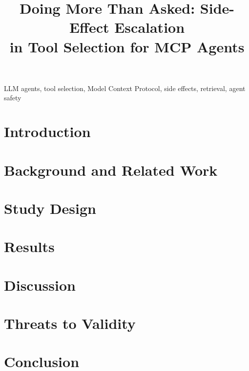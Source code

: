 \documentclass[conference]{IEEEtran}
\begin{document}
\title{Doing More Than Asked: Side-Effect Escalation\\in Tool Selection for MCP Agents}

\author{
\and
{}
}

\maketitle

\begin{abstract}

\end{abstract}

\begin{IEEEkeywords}
LLM agents, tool selection, Model Context Protocol, side effects, retrieval, agent safety
\end{IEEEkeywords}

\section{Introduction}


\section{Background and Related Work}


\section{Study Design}


\section{Results}


\section{Discussion}


\section{Threats to Validity}\label{sec:threats}


\section{Conclusion}


\balance


\end{document}
